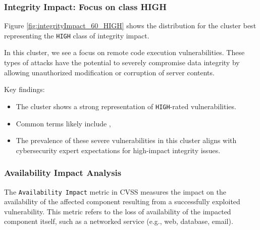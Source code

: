 \documentclass[12pt]{article}
\begin{document}
\subsubsection{Integrity Impact: Focus on class HIGH}

Figure \ref{fig:integrityImpact_60_HIGH} shows the distribution for the cluster best representing
the \texttt{HIGH} class of integrity impact.


In this cluster, we see a focus on remote code execution vulnerabilities. These
types of attacks have the potential to severely compromise data integrity by allowing unauthorized
modification or corruption of server contents.

Key findings:
\begin{itemize}

	\item The cluster shows a strong representation of \texttt{HIGH}-rated vulnerabilities.

	\item Common terms likely include , 

	\item The prevalence of these severe vulnerabilities in this cluster aligns with cybersecurity
	      expert expectations for high-impact integrity issues.

\end{itemize}

\subsubsection{Availability Impact Analysis}

The \texttt{Availability Impact} metric in CVSS measures the impact on the availability of the
affected component resulting from a successfully exploited vulnerability. This metric refers to the
loss of availability of the impacted component itself, such as a networked service (e.g., web,
database, email).
\end{document}
